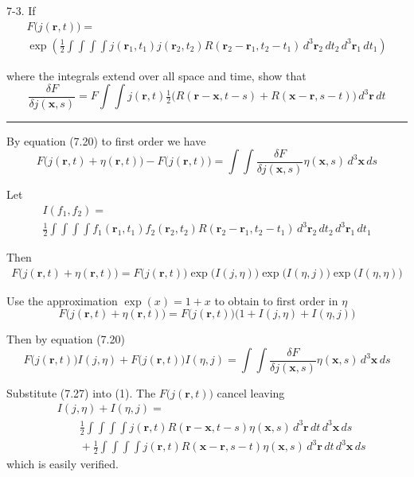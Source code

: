\documentclass[12pt]{article}
\begin{document}
7-3.
If
\begin{multline*}
F\big(j(\mathbf r,t)\big)=
\\
\exp\left(
\frac{1}{2}\int\int\int\int
j(\mathbf r_1,t_1)j(\mathbf r_2,t_2)R(\mathbf r_2-\mathbf r_1,t_2-t_1)
\,d^3\mathbf r_2\,dt_2\,d^3\mathbf r_1\,dt_1
\right)
\end{multline*}

where the integrals extend over all space and time, show that
\begin{equation*}
\frac{\delta F}{\delta j(\mathbf x,s)}
=F\int\int j(\mathbf r,t)
\tfrac{1}{2}
\big(R(\mathbf r-\mathbf x,t-s)+R(\mathbf x-\mathbf r,s-t)\big)
\,d^3\mathbf r\,dt
\tag{7.27}
\end{equation*}

\bigskip
\hrule

\bigskip
By equation (7.20) to first order we have
\begin{equation*}
F\big(j(\mathbf r,t)+\eta(\mathbf r,t)\big)
-F\big(j(\mathbf r,t)\big)
=\int\int
\frac{\delta F}{\delta j(\mathbf x,s)}\eta(\mathbf x,s)\,d^3\mathbf x\,ds
\end{equation*}

Let
\begin{multline*}
I(f_1,f_2)=
\\
\frac{1}{2}
\int\int\int\int
f_1(\mathbf r_1,t_1)f_2(\mathbf r_2,t_2)R(\mathbf r_2-\mathbf r_1,t_2-t_1)
\,d^3\mathbf r_2\,dt_2\,d^3\mathbf r_1\,dt_1
\end{multline*}

Then
\begin{align*}
F\big(j(\mathbf r,t)+\eta(\mathbf r,t)\big)=F\big(j(\mathbf r,t)\big)
\exp\big(I(j,\eta)\big)\exp\big(I(\eta,j)\big)\exp\big(I(\eta,\eta)\big)
\end{align*}

Use the approximation $\exp(x)=1+x$ to obtain to first order in $\eta$
\begin{equation*}
F\big(j(\mathbf r,t)+\eta(\mathbf r,t)\big)
=F\big(j(\mathbf r,t)\big)\big(1+I(j,\eta)+I(\eta,j)\big)
\end{equation*}

Then by equation (7.20)
\begin{equation*}
F\big(j(\mathbf r,t)\big)I(j,\eta)+F\big(j(\mathbf r,t)\big)I(\eta,j)
=\int\int
\frac{\delta F}{\delta j(\mathbf x,s)}\eta(\mathbf x,s)\,d^3\mathbf x\,ds
\tag{1}
\end{equation*}

Substitute (7.27) into (1).
The $F\big(j(\mathbf r,t)\big)$ cancel leaving
\begin{align*}
&I(j,\eta)+I(\eta,j)=
\\
&\qquad\frac{1}{2}\int\int\int\int
j(\mathbf r,t)R(\mathbf r-\mathbf x,t-s)\eta(\mathbf x,s)\,d^3\mathbf r\,dt\,d^3\mathbf x\,ds
\\
&\qquad{}+\frac{1}{2}\int\int\int\int
j(\mathbf r,t)R(\mathbf x-\mathbf r,s-t)\eta(\mathbf x,s)\,d^3\mathbf r\,dt\,d^3\mathbf x\,ds
\end{align*}
which is easily verified.
\end{document}
